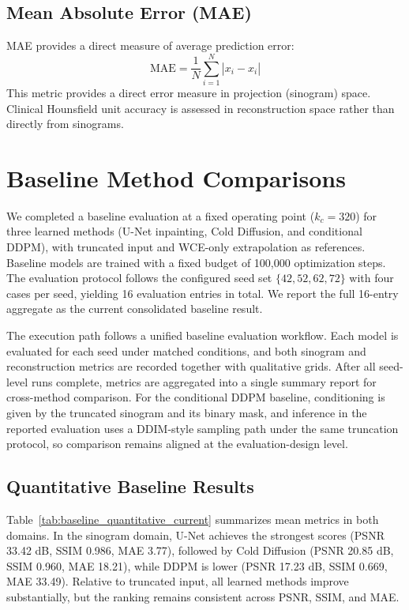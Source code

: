 \subsection{Mean Absolute Error (MAE)}

MAE provides a direct measure of average prediction error:
\begin{equation}
\text{MAE} = \frac{1}{N}\sum_{i=1}^{N}|x_i - \hat{x}_i|
\end{equation}
This metric provides a direct error measure in projection (sinogram) space. Clinical Hounsfield unit accuracy is assessed in reconstruction space rather than directly from sinograms.

\section{Baseline Method Comparisons}

We completed a baseline evaluation at a fixed operating point ($k_c=320$) for three learned methods (U-Net inpainting, Cold Diffusion, and conditional DDPM), with truncated input and WCE-only extrapolation as references. Baseline models are trained with a fixed budget of 100,000 optimization steps. The evaluation protocol follows the configured seed set $\{42,52,62,72\}$ with four cases per seed, yielding 16 evaluation entries in total. We report the full 16-entry aggregate as the current consolidated baseline result.

The execution path follows a unified baseline evaluation workflow. Each model is evaluated for each seed under matched conditions, and both sinogram and reconstruction metrics are recorded together with qualitative grids. After all seed-level runs complete, metrics are aggregated into a single summary report for cross-method comparison.
For the conditional DDPM baseline, conditioning is given by the truncated sinogram and its binary mask, and inference in the reported evaluation uses a DDIM-style sampling path under the same truncation protocol, so comparison remains aligned at the evaluation-design level.

\subsection{Quantitative Baseline Results}

Table~\ref{tab:baseline_quantitative_current} summarizes mean metrics in both domains. In the sinogram domain, U-Net achieves the strongest scores (PSNR 33.42 dB, SSIM 0.986, MAE 3.77), followed by Cold Diffusion (PSNR 20.85 dB, SSIM 0.960, MAE 18.21), while DDPM is lower (PSNR 17.23 dB, SSIM 0.669, MAE 33.49). Relative to truncated input, all learned methods improve substantially, but the ranking remains consistent across PSNR, SSIM, and MAE.

